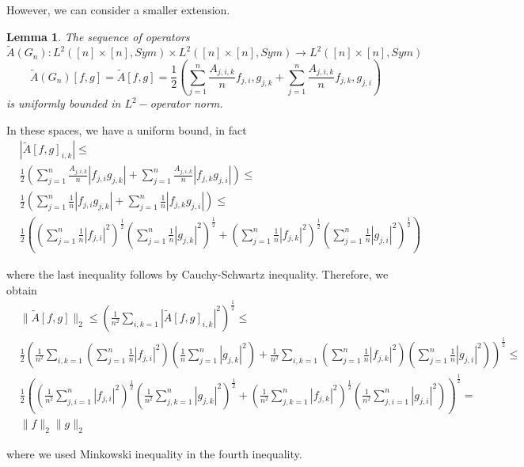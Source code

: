 \documentclass[11pt]{article}
\newtheorem{lemma}[theorem]{Lemma}
\begin{document}
However, we can consider a smaller extension.

\begin{lemma}\label{LemmaUnifBoundNormHyp}
    The sequence of operators $$
\widetilde{A}(G_n):L^2{([n]\times [n],Sym)}\times L^2{([n]\times [n],Sym)}\longrightarrow L^{2}([n]\times [n], Sym)
$$
$$\widetilde{A}(G_n)[f,g]=\widetilde{A}[f,g]=\frac{1}{2}(\sum^n_{j=1}\frac{A_{j,i,k}}{n}f_{j,i},g_{j,k} +\sum^n_{j=1}\frac{A_{j,i,k}}{n}f_{j,k},g_{j,i})
$$
is uniformly bounded in $L^2-$operator norm.
\end{lemma}
\proof
In these spaces, we have a uniform bound, in fact
$$
\begin{aligned}
&
|\widetilde{A}[f,g]_{i,k}|\leq
\\
&\frac{1}{2}(\sum^n_{j=1}\frac{A_{j,i,k}}{n}|f_{j,i}g_{j,k}| +\sum^n_{j=1}\frac{A_{j,i,k}}{n}|f_{j,k}g_{j,i}|)\leq\\&
\frac{1}{2}(\sum^n_{j=1}\frac{1}{n}|f_{j,i}g_{j,k}| +\sum^n_{j=1}\frac{1}{n}|f_{j,k}g_{j,i}|)\leq 
\\ &
\frac{1}{2}((\sum^n_{j=1}\frac{1}{n}|f_{j,i}|^2)^{\frac{1}{2}}(\sum^n_{j=1}\frac{1}{n}|g_{j,k}|^2 )^{\frac{1}{2}}+(\sum^n_{j=1}\frac{1}{n}|f_{j,k}|^2)^{\frac{1}{2}}(\sum^n_{j=1}\frac{1}{n}|g_{j,i}|^2)^{\frac{1}{2}})
\end{aligned}
$$

where the last inequality follows by Cauchy-Schwartz inequality. Therefore, we obtain
$$
\begin{aligned}
&
\|\widetilde{A}[f,g]\|_2\leq
(\frac{1}{n^2}\sum_{i,k=1}
|\widetilde{A}[f,g]_{i,k}|^2)^{\frac{1}{2}}\leq
\\&
\frac{1}{2}(\frac{1}{n^2}\sum_{i,k=1}(\sum^n_{j=1}\frac{1}{n}|f_{j,i}|^2)(\frac{1}{n}\sum^n_{j=1}|g_{j,k}|^2 )+\frac{1}{n^2}\sum_{i,k=1}(\sum^n_{j=1}\frac{1}{n}|f_{j,k}|^2)(\sum^n_{j=1}\frac{1}{n}|g_{j,i}|^2))^{\frac{1}{2}}\leq
\\&
\frac{1}{2}((\frac{1}{n^2}\sum^n_{j,i=1}|f_{j,i}|^2)^{\frac{1}{2}}(\frac{1}{n^2}\sum^n_{j,k=1}|g_{j,k}|^2 )^{\frac{1}{2}}+(\frac{1}{n^2}\sum^n_{j,k=1}|f_{j,k}|^2)^{\frac{1}{2}}(\frac{1}{n^2}\sum^n_{j,i=1}|g_{j,i}|^2))^{\frac{1}{2}}=\\
&  \|f\|_{2}\|g\|_{2}
\end{aligned}
$$

where we used Minkowski inequality in the fourth inequality.
\end{document}
